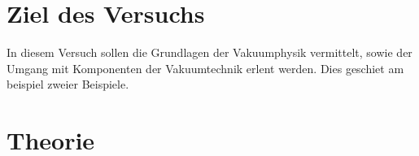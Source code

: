 \section{Ziel des Versuchs}
In diesem Versuch sollen die Grundlagen der Vakuumphysik vermittelt, sowie der Umgang mit Komponenten der Vakuumtechnik erlent werden. 
Dies geschiet am beispiel zweier Beispiele.

\section{Theorie}
\label{sec:Theorie}

\cite{sample}
